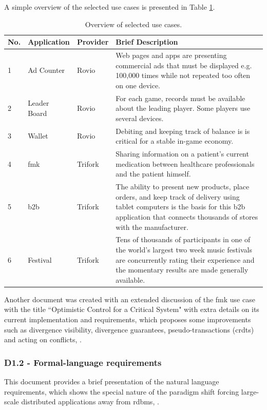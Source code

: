 \documentclass[12pt,twoside]{article}
\begin{document}
A simple overview of the selected use cases is presented in Table \ref{tb:use_cases}.
\begin{table}[ht!]
	\begin{tabular}{|l|p{2.8cm}|l|p{8.1cm}|}
		\hline
		No. & Application & Provider & Brief Description \\
		\hline
		\hline
		1 & Ad Counter & Rovio & Web pages and apps are presenting commercial ads that must be displayed e.g. 100,000 times while not repeated too often on one device. \\
		\hline
		2 & Leader Board & Rovio & For each game, records must be available about the leading player. Some players use several devices. \\
		\hline
		3 & Wallet & Rovio & Debiting and keeping track of balance is is critical for a stable in-game economy. \\
		\hline
		4 & \gls{fmk} & Trifork & Sharing information on a patient’s current medication between healthcare professionals and the patient himself. \\
		\hline
		5 & \gls{b2b} & Trifork & The ability to present new products, place orders, and keep track of delivery using tablet computers is the basis for this \gls{b2b} application that connects thousands of stores with the manufacturer. \\
		\hline
		6 & Festival & Trifork & Tens of thousands of participants in one of the world’s largest two week music festivals are concurrently rating their experience and the momentary results are made generally available. \\
		\hline
	\end{tabular}
	
	\caption{Overview of selected use cases.}
	\label{tb:use_cases}
\end{table}

Another document was created with an extended discussion of the \gls{fmk} use case with the title ``Optimistic Control for a Critical System" with extra details on its current implementation and requirements, which proposes some improvements such as divergence visibility, divergence guarantees, pseudo-transactions (\glspl{crdt}) and acting on conflicts, \cite{Benedictus2014b}.


\subsubsection{D1.2 - Formal-language requirements}
This document provides a brief presentation of the natural language requirements, which shows the special nature of the paradigm shift forcing large-scale distributed applications away from \gls{rdbms}, \cite{Asco2014a}.
\end{document}
